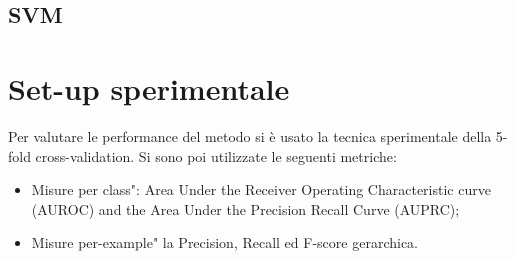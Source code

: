 \documentclass{article}
\begin{document}
\subsection{SVM}


\section{Set-up sperimentale}

Per valutare le performance del metodo si è usato la tecnica sperimentale della 5-fold
cross-validation.  Si sono poi utilizzate le seguenti metriche:

\begin{itemize}
\item Misure per  class":   Area  Under  the  Receiver  Operating  Characteristic
curve (AUROC) and the Area Under the Precision Recall Curve (AUPRC);
\item Misure per-example" la Precision, Recall ed F-score gerarchica.
\end{itemize}








\end{document}

